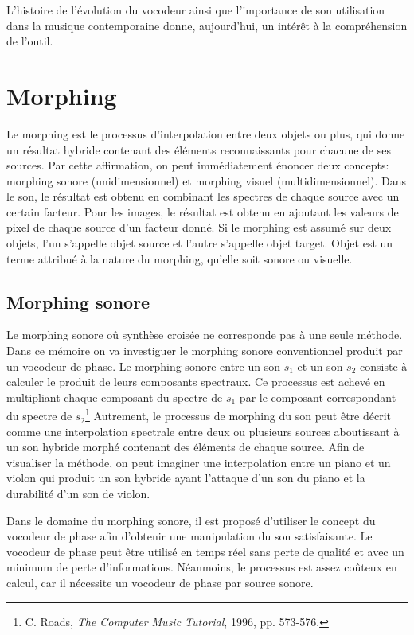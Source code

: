 L'histoire de l'évolution du vocodeur ainsi que l'importance de son utilisation dans la musique contemporaine donne, aujourd'hui, un intérêt à la compréhension de l'outil.

\section{Morphing}

Le morphing est le processus d'interpolation entre deux objets ou plus, qui donne un résultat hybride contenant des éléments reconnaissants pour chacune de ses sources. Par cette affirmation, on peut immédiatement énoncer deux concepts: morphing sonore (unidimensionnel) et morphing visuel (multidimensionnel). Dans le son, le résultat est obtenu en combinant les spectres de chaque source avec un certain facteur. Pour les images, le résultat est obtenu en ajoutant les valeurs de pixel de chaque source d’un facteur donné. Si le morphing est assumé sur deux objets, l'un s'appelle objet source et l'autre s'appelle objet target. Objet est un terme attribué à la nature du morphing, qu'elle soit sonore ou visuelle.

    \subsection{Morphing sonore}

Le morphing sonore oû synthèse croisée ne corresponde pas à une seule méthode. Dans ce mémoire on va investiguer le morphing sonore conventionnel produit par un vocodeur de phase. Le morphing sonore entre un son $s_1$ et un son $s_2$ consiste à calculer le produit de leurs composants spectraux. Ce processus est achevé en multipliant chaque composant du spectre de $s_1$ par le composant correspondant du spectre de $s_2$\footnote{C. Roads, \textit{The Computer Music Tutorial}, 1996, pp. 573-576. \nocite{Roads1996}} Autrement, le processus de morphing du son peut être décrit comme une interpolation spectrale entre deux ou plusieurs sources aboutissant à un son hybride morphé contenant des éléments de chaque source. Afin de visualiser la méthode, on peut imaginer une interpolation entre un piano et un violon qui produit un son hybride ayant l'attaque d'un son du piano et la durabilité d'un son de violon.   

Dans le domaine du morphing sonore, il est proposé d’utiliser le concept du vocodeur de phase afin d'obtenir une manipulation du son satisfaisante. Le vocodeur de phase peut être utilisé en temps réel sans perte de qualité et avec un minimum de perte d'informations. Néanmoins, le processus est assez coûteux en calcul, car il nécessite un vocodeur de phase par source sonore.

